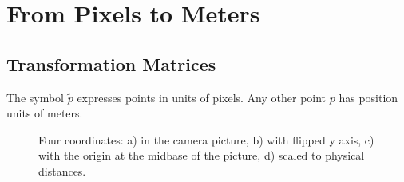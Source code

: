 \documentclass[12pt, a4paper]
{article}
\providecommand{\tp}{\tilde{p}}
\begin{document}
\section{From Pixels to Meters} 
\subsection{Transformation Matrices}
The symbol $\tp$ expresses points in units of pixels. Any other point $p$ has position units of meters.
\begin{figure}[H]
\centering

\caption{Four coordinates: a) in the camera picture, b) with flipped y axis, c) with the origin at the midbase of the picture, d) scaled to physical distances.
\label{fig:robotframe}}
\end{figure}
\end{document}
